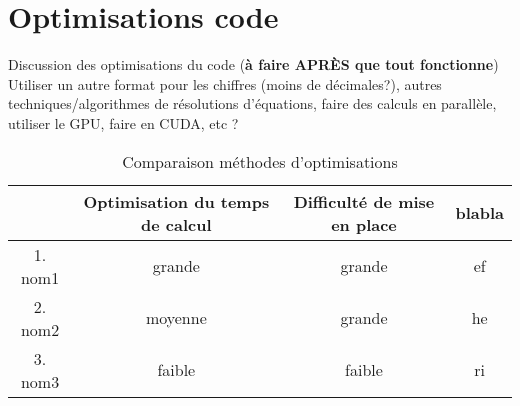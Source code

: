 \chapter{Optimisations code}
\label{chaper-5}

Discussion des optimisations du code (\textbf{à faire APRÈS que tout fonctionne})\\

Utiliser un autre format pour les chiffres (moins de décimales?), autres techniques/algorithmes de résolutions d'équations, faire des calculs en parallèle, utiliser le GPU, faire en CUDA, etc ?\\

\begin{table}[h]
    \centering
    \begin{tabular}{|c|c|c|c|}
        \hline
         & Optimisation du temps de calcul & Difficulté de mise en place & blabla\\
         \hline
         1. nom1 & grande & grande & ef\\
         2. nom2 & moyenne & grande & he\\
         3. nom3 & faible & faible & ri\\
         \hline
    \end{tabular}
    \caption{Comparaison méthodes d'optimisations}
    \label{tab:optimisation-table}
\end{table}